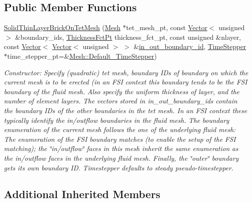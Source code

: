 \subsection*{Public Member Functions}
\begin{DoxyCompactItemize}
\item 
\hyperlink{classoomph_1_1SolidThinLayerBrickOnTetMesh_ac06a05511ae55f0d554e940789661de1}{Solid\+Thin\+Layer\+Brick\+On\+Tet\+Mesh} (\hyperlink{classoomph_1_1Mesh}{Mesh} $\ast$tet\+\_\+mesh\+\_\+pt, const \hyperlink{classoomph_1_1Vector}{Vector}$<$ unsigned $>$ \&boundary\+\_\+ids, \hyperlink{classoomph_1_1SolidThinLayerBrickOnTetMesh_ae4289650b0c0eccb2fd3d661b85e85ee}{Thickness\+Fct\+Pt} thickness\+\_\+fct\+\_\+pt, const unsigned \&nlayer, const \hyperlink{classoomph_1_1Vector}{Vector}$<$ \hyperlink{classoomph_1_1Vector}{Vector}$<$ unsigned $>$ $>$ \&\hyperlink{classoomph_1_1ThinLayerBrickOnTetMesh_a3cfd55eb5bbd6801e9d4cd271e602cd8}{in\+\_\+out\+\_\+boundary\+\_\+id}, \hyperlink{classoomph_1_1TimeStepper}{Time\+Stepper} $\ast$time\+\_\+stepper\+\_\+pt=\&\hyperlink{classoomph_1_1Mesh_a12243d0fee2b1fcee729ee5a4777ea10}{Mesh\+::\+Default\+\_\+\+Time\+Stepper})
\begin{DoxyCompactList}\small\item\em Constructor\+: Specify (quadratic) tet mesh, boundary I\+Ds of boundary on which the current mesh is to be erected (in an F\+SI context this boundary tends to be the F\+SI boundary of the fluid mesh. Also specify the uniform thickness of layer, and the number of element layers. The vectors stored in in\+\_\+out\+\_\+boundary\+\_\+ids contain the boundary I\+Ds of the other boundaries in the tet mesh. In an F\+SI context these typically identify the in/outflow boundaries in the fluid mesh. The boundary enumeration of the current mesh follows the one of the underlying fluid mesh\+: The enumeration of the F\+SI boundary matches (to enable the setup of the F\+SI matching); the \char`\"{}in/outflow\char`\"{} faces in this mesh inherit the same enumeration as the in/outflow faces in the underlying fluid mesh. Finally, the \char`\"{}outer\char`\"{} boundary gets its own boundary ID. Timestepper defaults to steady pseudo-\/timestepper. \end{DoxyCompactList}\end{DoxyCompactItemize}
\subsection*{Additional Inherited Members}


